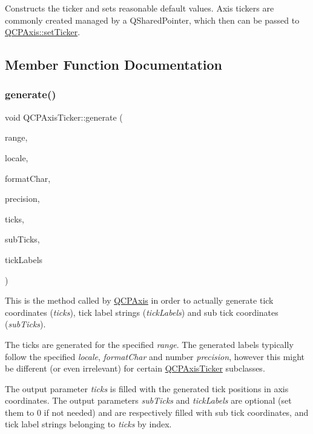 Constructs the ticker and sets reasonable default values. Axis tickers are commonly created managed by a Q\+Shared\+Pointer, which then can be passed to \mbox{\hyperlink{class_q_c_p_axis_a4ee03fcd2c74d05cd1a419b9af5cfbdc}{Q\+C\+P\+Axis\+::set\+Ticker}}. 

\subsection{Member Function Documentation}
\mbox{\label{class_q_c_p_axis_ticker_aefbd11725678ca824add8cf926cbc856}} 
\subsubsection{\texorpdfstring{generate()}{generate()}}
{\footnotesize\ttfamily void Q\+C\+P\+Axis\+Ticker\+::generate (\begin{DoxyParamCaption}\item[{const \mbox{\hyperlink{class_q_c_p_range}{Q\+C\+P\+Range}} \&}]{range,  }\item[{const Q\+Locale \&}]{locale,  }\item[{Q\+Char}]{format\+Char,  }\item[{int}]{precision,  }\item[{Q\+Vector$<$ double $>$ \&}]{ticks,  }\item[{Q\+Vector$<$ double $>$ $\ast$}]{sub\+Ticks,  }\item[{Q\+Vector$<$ Q\+String $>$ $\ast$}]{tick\+Labels }\end{DoxyParamCaption})\hspace{0.3cm}{\ttfamily [virtual]}}

This is the method called by \mbox{\hyperlink{class_q_c_p_axis}{Q\+C\+P\+Axis}} in order to actually generate tick coordinates ({\itshape ticks}), tick label strings ({\itshape tick\+Labels}) and sub tick coordinates ({\itshape sub\+Ticks}).

The ticks are generated for the specified {\itshape range}. The generated labels typically follow the specified {\itshape locale}, {\itshape format\+Char} and number {\itshape precision}, however this might be different (or even irrelevant) for certain \mbox{\hyperlink{class_q_c_p_axis_ticker}{Q\+C\+P\+Axis\+Ticker}} subclasses.

The output parameter {\itshape ticks} is filled with the generated tick positions in axis coordinates. The output parameters {\itshape sub\+Ticks} and {\itshape tick\+Labels} are optional (set them to 0 if not needed) and are respectively filled with sub tick coordinates, and tick label strings belonging to {\itshape ticks} by index. \mbox{\label{class_q_c_p_axis_ticker_a47752abba8293e6dc18491501ae34008}} 

